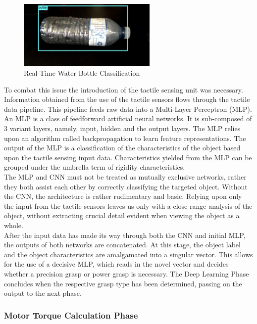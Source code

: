 \documentclass[11.5pt]{article}
\begin{document}
\begin{figure}[H]
    \centering
    \includegraphics[width=0.6\textwidth]{assets/Bottleclass.png}
    \caption{Real-Time Water Bottle Classification}
    \label{fig:WBC}
\end{figure}

To combat this issue the introduction of the tactile sensing unit was necessary. Information obtained from the use of the tactile sensors flows through the tactile data pipeline. This pipeline feeds raw data into a Multi-Layer Perceptron (MLP). An MLP is a class of feedforward artificial neural networks. It is sub-composed of 3 variant layers, namely, input, hidden and the output layers.  The MLP relies upon an algorithm called backpropagation to learn feature representations.  The output of the MLP is a classification of the characteristics of the object based upon the tactile sensing input data.  Characteristics yielded from the MLP can be grouped under the umbrella term of rigidity characteristics.\\

The MLP and CNN must not be treated as mutually exclusive networks, rather they both assist each other by correctly classifying the targeted object. Without the CNN, the architecture is rather rudimentary and basic. Relying upon only the input from the tactile sensors leaves us only with a close-range analysis of the object, without extracting crucial detail evident when viewing the object as a whole. \\

After the input data has made its way through both the CNN and initial MLP, the outputs of both networks are concatenated. At this stage, the object label and the object characteristics are amalgamated into a singular vector. This allows for the use of a decisive MLP, which reads in the novel vector and decides whether a precision grasp or power grasp is necessary. The Deep Learning Phase concludes when the respective grasp type has been determined, passing on the output to the next phase.

\subsubsection{Motor Torque Calculation Phase}
\end{document}
